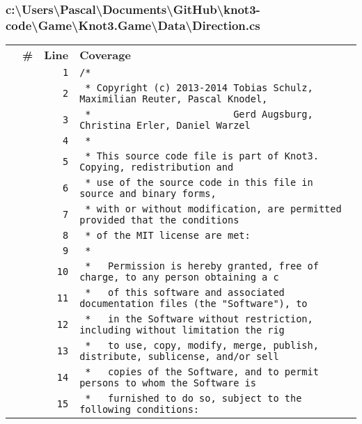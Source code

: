\documentclass[a4paper,10pt]{article}
\begin{document}
\subsubsection{c:\textbackslash Users\textbackslash Pascal\textbackslash Documents\textbackslash GitHub\textbackslash knot3-code\textbackslash Game\textbackslash Knot3.Game\textbackslash Data\textbackslash Direction.cs}
\begin{longtable}[l]{lrrl}
\textbf{} & \textbf{\#} & \textbf{Line} & \textbf{Coverage}\\
\cellcolor{gray} &  & \verb~1~ & \verb~/*~\\
\cellcolor{gray} &  & \verb~2~ & \verb~ * Copyright (c) 2013-2014 Tobias Schulz, Maximilian Reuter, Pascal Knodel,~\\
\cellcolor{gray} &  & \verb~3~ & \verb~ *                         Gerd Augsburg, Christina Erler, Daniel Warzel~\\
\cellcolor{gray} &  & \verb~4~ & \verb~ *~\\
\cellcolor{gray} &  & \verb~5~ & \verb~ * This source code file is part of Knot3. Copying, redistribution and~\\
\cellcolor{gray} &  & \verb~6~ & \verb~ * use of the source code in this file in source and binary forms,~\\
\cellcolor{gray} &  & \verb~7~ & \verb~ * with or without modification, are permitted provided that the conditions~\\
\cellcolor{gray} &  & \verb~8~ & \verb~ * of the MIT license are met:~\\
\cellcolor{gray} &  & \verb~9~ & \verb~ *~\\
\cellcolor{gray} &  & \verb~10~ & \verb~ *   Permission is hereby granted, free of charge, to any person obtaining a c~\\
\cellcolor{gray} &  & \verb~11~ & \verb~ *   of this software and associated documentation files (the "Software"), to ~\\
\cellcolor{gray} &  & \verb~12~ & \verb~ *   in the Software without restriction, including without limitation the rig~\\
\cellcolor{gray} &  & \verb~13~ & \verb~ *   to use, copy, modify, merge, publish, distribute, sublicense, and/or sell~\\
\cellcolor{gray} &  & \verb~14~ & \verb~ *   copies of the Software, and to permit persons to whom the Software is~\\
\cellcolor{gray} &  & \verb~15~ & \verb~ *   furnished to do so, subject to the following conditions:~\\

\end{longtable}
\end{document}
